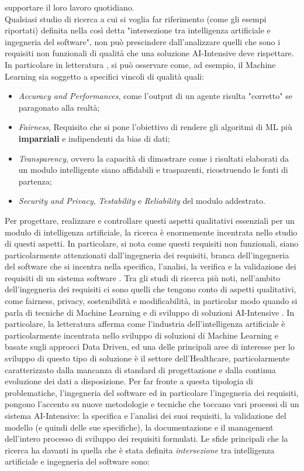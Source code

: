 supportare il loro lavoro quotidiano\cite{rech2004artificial}.\\

Qualsiasi studio di ricerca a cui si voglia far riferimento (come gli esempi riportati) definita nella così detta "intersezione tra intelligenza artificiale e ingegneria del software", non può prescindere dall'analizzare quelli che sono i requisiti non funzionali di qualità che una soluzione AI-Intensive deve rispettare. In particolare in letteratura \cite{NFRForML}, si può osservare come, ad esempio, il Machine Learning sia soggetto a specifici vincoli di qualità quali: 

\begin{itemize}
    \item \emph{Accuracy and Performances}, come l'output di un agente risulta "corretto" se paragonato alla realtà;
    \item \emph{Fairness}, Requisito che si pone l'obiettivo di rendere gli algoritmi di ML più \textbf{imparziali} e indipendenti da bias di dati;
    \item \emph{Transparency}, ovvero la capacità di dimostrare come i risultati elaborati da un modulo intelligente siano affidabili e trasparenti, ricostruendo le fonti di partenza;
    \item \emph{Security and Privacy}, \emph{Testability} e \emph{Reliability} del modulo addestrato.
\end{itemize}

Per progettare, realizzare e controllare questi aspetti qualitativi essenziali per un modulo di intelligenza artificiale, la ricerca è enormemente incentrata nello studio di questi aspetti. In particolare, si nota come questi requisiti non funzionali, siano particolarmente attenzionati dall'ingegneria dei requisiti, branca dell'ingegneria del software che si incentra nella specifica, l'analisi, la verifica e la validazione dei requisiti di un sistema software \cite{RE&Ai}. Tra gli studi di ricerca più noti, nell'ambito dell'ingegneria dei requisiti ci sono quelli che tengono conto di aspetti qualitativi, come fairness, privacy, sostenibilità e modificabilità, in particolar modo quando si parla di tecniche di Machine Learning e di sviluppo di soluzioni AI-Intensive \cite{NFRForML}. In particolare, la letteratura afferma come l'industria dell'intelligenza artificiale è particolarmente incentrata nello sviluppo di soluzioni di Machine Learning e basate sugli approcci Data Driven, ed una delle principali aree di interesse per lo sviluppo di questo tipo di soluzione è il settore dell'Healthcare, particolarmente caratterizzato dalla mancanza di standard di progettazione e dalla continua evoluzione dei dati a disposizione\cite{RE&Ai}. Per far fronte a questa tipologia di problematiche, l'ingegneria del software ed in particolare l'ingegneria dei requisiti, pongono l'accento su nuove metodologie e tecniche che toccano vari processi di un sistema AI-Intensive: la specifica e l'analisi dei suoi requisiti, la validazione del modello (e quindi delle sue specifiche), la documentazione e il management dell'intero processo di sviluppo dei requisiti formulati. Le sfide principali che la ricerca ha davanti in quella che è stata definita \textit{intersezione} tra intelligenza artificiale e ingegneria del software sono:

